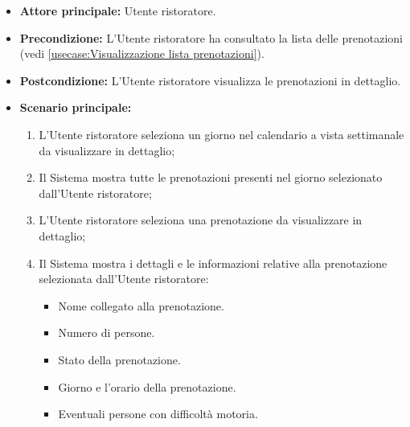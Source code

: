 \label{usecase:Visualizza dettaglio lista prenotazioni}
\begin{itemize}
	\item \textbf{Attore principale:} Utente ristoratore.

	\item \textbf{Precondizione:} L'Utente ristoratore ha consultato la lista delle prenotazioni (vedi \autoref{usecase:Visualizzazione lista prenotazioni}).

	\item \textbf{Postcondizione:} L'Utente ristoratore visualizza le prenotazioni in dettaglio.


	\item \textbf{Scenario principale:}
	      \begin{enumerate}
		      \item L'Utente ristoratore seleziona un giorno nel calendario a vista settimanale da visualizzare in dettaglio;
		      \item Il Sistema mostra tutte le prenotazioni presenti nel giorno selezionato dall'Utente ristoratore;
		      
		      \item L'Utente ristoratore seleziona una prenotazione da visualizzare in dettaglio;
		      \item Il Sistema mostra i dettagli e le informazioni relative alla prenotazione selezionata dall'Utente ristoratore:
		      \begin{itemize}
				\item Nome collegato alla prenotazione.
				\item Numero di persone.
				\item Stato della prenotazione.
				\item Giorno e l'orario della prenotazione.
				\item Eventuali persone con difficoltà motoria.
			  \end{itemize}

	      \end{enumerate}
\end{itemize}